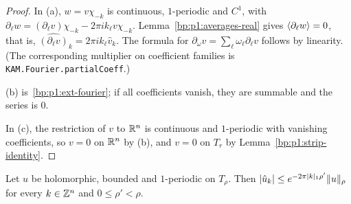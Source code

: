 \begin{proof}
\label{step:p1:fb-derivative}
In (a), $w=v\chi_{-k}$ is continuous, $1$-periodic and $C^1$, with
$\partial_\ell w=(\partial_\ell v)\chi_{-k}-2\pi ik_\ell v\chi_{-k}$. Lemma~\ref{bp:p1:averages-real} gives
$\langle \partial_\ell w\rangle=0$, that is, $\widehat{(\partial_\ell v)}_k=2\pi ik_\ell\hat v_k$. The formula for
$\partial_\omega v=\sum_\ell\omega_\ell\partial_\ell v$ follows by linearity. (The corresponding
multiplier on coefficient families is \nolinkurl{KAM.Fourier.partialCoeff}.)

\label{step:p1:fb-series}
(b) is~\ref{bp:p1:ext-fourier}; if all coefficients vanish, they are summable and the series is $0$.

\label{step:p1:fb-holomorphic}
In (c), the restriction of $v$ to $\mathbb{R}^n$ is continuous and $1$-periodic with vanishing coefficients, so
$v=0$ on $\mathbb{R}^n$ by (b), and $v=0$ on $T_r$ by Lemma~\ref{bp:p1:strip-identity}.
\end{proof}

\begin{lemma}\label{bp:p1:decay}
Let $u$ be holomorphic, bounded and $1$-periodic on $T_\rho$. Then
$\lvert \hat u_k\rvert\le e^{-2\pi\lvert k\rvert_1\rho'}\lVert u\rVert_\rho$ for every $k\in\mathbb{Z}^n$ and $0\le\rho'<\rho$.
\end{lemma}

